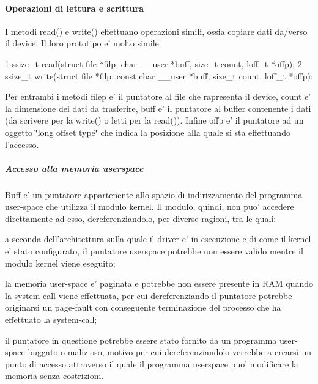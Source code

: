 \paragraph*{Operazioni di lettura e scrittura}

I metodi read() e write() effettuano operazioni simili, ossia copiare dati da/verso il device. Il loro prototipo e' molto simile.


\begin{DoxyCode}
1 ssize\_t read(struct file *filp, char \_\_user *buff, size\_t count, loff\_t *offp);
2 ssize\_t write(struct file *filp, const char \_\_user *buff, size\_t count, loff\_t *offp);
\end{DoxyCode}


Per entrambi i metodi filep e' il puntatore al file che rapresenta il device, count e' la dimensione dei dati da trasferire, buff e' il puntatore al buffer contenente i dati (da scrivere per la write() o letti per la read()). Infine offp e' il puntatore ad un oggetto \char`\"{}long offset type\char`\"{} che indica la posizione alla quale si sta effettuando l'accesso. \subparagraph*{Accesso alla memoria userspace}

Buff e' un puntatore appartenente allo spazio di indirizzamento del programma user-\/space che utilizza il modulo kernel. Il modulo, quindi, non puo' accedere direttamente ad esso, dereferenziandolo, per diverse ragioni, tra le quali\+:
\begin{DoxyItemize}
\item a seconda dell'architettura sulla quale il driver e' in esecuzione e di come il kernel e' stato configurato, il puntatore userspace potrebbe non essere valido mentre il modulo kernel viene eseguito;
\item la memoria user-\/space e' paginata e potrebbe non essere presente in R\+A\+M quando la system-\/call viene effettuata, per cui dereferenziando il puntatore potrebbe originarsi un page-\/fault con conseguente terminazione del processo che ha effettuato la system-\/call;
\item il puntatore in questione potrebbe essere stato fornito da un programma user-\/space buggato o malizioso, motivo per cui dereferenziandolo verrebbe a crearsi un punto di accesso attraverso il quale il programma userspace puo' modificare la memoria senza costrizioni.
\end{DoxyItemize}

